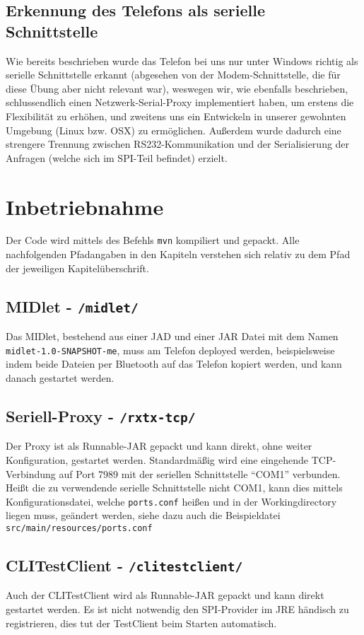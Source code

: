 \documentclass[paper=a4, fontsize=11pt]{scrartcl}
\begin{document}
\subsection{Erkennung des Telefons als serielle Schnittstelle}
Wie bereits beschrieben wurde das Telefon bei uns nur unter Windows richtig als serielle Schnittstelle erkannt (abgesehen von der Modem-Schnittstelle, die für diese Übung aber nicht relevant war), weswegen wir, wie ebenfalls beschrieben, schlussendlich einen Netzwerk-Serial-Proxy implementiert haben, um erstens die Flexibilität zu erhöhen, und zweitens uns ein Entwickeln in unserer gewohnten Umgebung (Linux bzw. OSX) zu ermöglichen. Außerdem wurde dadurch eine strengere Trennung zwischen RS232-Kommunikation und der Serialisierung der Anfragen (welche sich im SPI-Teil befindet) erzielt.


\section{Inbetriebnahme}
Der Code wird mittels des Befehls \texttt{mvn} kompiliert und gepackt. Alle nachfolgenden Pfadangaben in den Kapiteln verstehen sich relativ zu dem Pfad der jeweiligen Kapitelüberschrift.

\subsection{MIDlet - \texttt{/midlet/}}
Das MIDlet, bestehend aus einer JAD und einer JAR Datei mit dem Namen \texttt{midlet-1.0-SNAPSHOT-me}, muss am Telefon deployed werden, beispielsweise indem beide Dateien per Bluetooth auf das Telefon kopiert werden, und kann danach gestartet werden.

\subsection{Seriell-Proxy -  \texttt{/rxtx-tcp/}}
Der Proxy ist als Runnable-JAR gepackt und kann direkt, ohne weiter Konfiguration, gestartet werden. Standardmäßig wird eine eingehende TCP-Verbindung auf Port 7989 mit der seriellen Schnittstelle \enquote{COM1} verbunden. Heißt die zu verwendende serielle Schnittstelle nicht COM1, kann dies mittels Konfigurationsdatei, welche \texttt{ports.conf} heißen und in der Workingdirectory liegen muss, geändert werden, siehe dazu auch die Beispieldatei \texttt{src/main/resources/ports.conf}

\subsection{CLITestClient -  \texttt{/clitestclient/}}
Auch der CLITestClient wird als Runnable-JAR gepackt und kann direkt gestartet werden. Es ist nicht notwendig den SPI-Provider im JRE händisch zu registrieren, dies tut der TestClient beim Starten automatisch.
\end{document}
